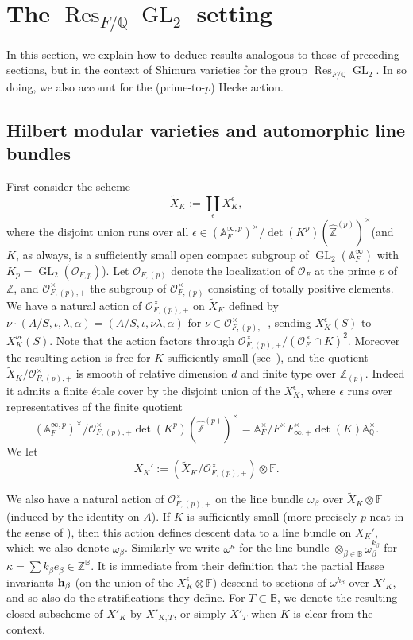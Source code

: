 \documentclass[11pt,pdflatex]{amsart}
\theoremstyle{plain}
\theoremstyle{definition}
\newcommand{\FF}{\mathbf{F}}
\newcommand{\QQ}{\mathbf{Q}}
\newcommand{\ZZ}{\mathbf{Z}}
\newcommand{\CO}{\mathcal{O}}
\theoremstyle{plain}
\theoremstyle{definition}
\theoremstyle{remark}
\numberwithin{equation}{section}
\numberwithin{figure}{section} \numberwithin{table}{subsection}
\newcommand{\Res}{{\operatorname{Res }}}
\newcommand{\GL}{{\operatorname{GL}}}
\def\AA{\mathbb{A}}
\def\BB{\mathbb{B}}
\def\FF{\mathbb{F}}
\def\QQ{\mathbb{Q}}
\def\ZZ{\mathbb{Z}}
\begin{document}
 \section{The $\Res_{F/\QQ}\GL_2$ setting} \label{section: GL2}
In this section, we explain how to deduce results analogous to those of preceding sections, but in the context of Shimura varieties for the group $\Res_{F/\QQ}\GL_2$.  In so doing, we also account for the (prime-to-$p$) Hecke action.

\subsection{Hilbert modular varieties and automorphic line bundles} First consider the scheme
$$ \widetilde{X}_K := \coprod_\epsilon X_K^\epsilon, $$
where the disjoint union runs over all $\epsilon \in (\AA_F^{\infty,p})^\times/\det(K^p)(\widehat{\ZZ}^{(p)})^\times$(and $K$, as always, is a sufficiently small open compact subgroup of $\GL_2(\AA_F^\infty)$ with $K_p = \GL_2(\CO_{F,p})$).  Let $\CO_{F,(p)}$ denote the localization of $\CO_F$ at the prime $p$ of $\ZZ$, and $\CO_{F,(p),+}^\times$ the subgroup of $\CO_{F,(p)}^\times$ consisting of totally positive elements.  We have a natural action of $\CO_{F,(p),+}^\times$ on $\widetilde{X}_K$ defined by $\nu\cdot(A/S,\iota,\lambda,\alpha) = (A/S,\iota,\nu\lambda,\alpha)$ for $\nu \in \CO_{F,(p),+}^\times$, sending $X_K^\epsilon(S)$ to $X_K^{\nu\epsilon}(S)$. Note that the action factors through $\CO_{F,(p),+}^\times/(\CO_F^\times \cap K)^2$.  Moreover the resulting action is free for $K$ sufficiently small (see~\cite[Lemma~2.4.1]{DS}), and the quotient $\widetilde{X}_K/\CO_{F,(p),+}^\times$ is smooth of relative dimension $d$ and finite type over $\ZZ_{(p)}$.  Indeed it admits a finite \'etale cover by the disjoint union of the $X_K^\epsilon$, where $\epsilon$ runs over representatives of the finite quotient
$$(\AA_F^{\infty,p})^\times/\CO_{F,(p),+}^\times\det(K^p)(\widehat{\ZZ}^{(p)})^\times = \AA_F^\times/F^\times F_{\infty,+}^\times\det(K)\AA_\QQ^\times.$$
  We let 
$$ X_K' := (\widetilde{X}_K/\CO_{F,(p),+}^\times) \otimes\FF.$$

We also have a natural action of $\CO_{F,(p),+}^\times$ on the line bundle $\omega_\beta$ over $\widetilde{X}_K \otimes \FF$ (induced by the identity on $A$).  If $K$ is sufficiently small (more precisely $p$-neat in the sense of \cite[Def.~3.2.3]{DS}), then this action defines descent data to a line bundle on $X_K'$, which we also denote $\omega_\beta$.  Similarly we write 
$\omega^\kappa$ for the line bundle $\otimes_{\beta\in\BB}\omega_\beta^{k_\beta}$ for $\kappa = \sum k_\beta e_\beta \in \ZZ^\BB$. It is immediate from their definition that the partial Hasse invariants ${\bf h}_\beta$ (on the union of the $X_K^\epsilon \otimes \FF$) descend to sections of $\omega^{h_\beta}$ over $X'_K$, and so also do the stratifications they define.  For $T \subset \BB$, we denote the resulting closed subscheme of $X'_K$ by $X'_{K,T}$, or simply $X'_T$ when $K$ is clear from the context.
\end{document}
